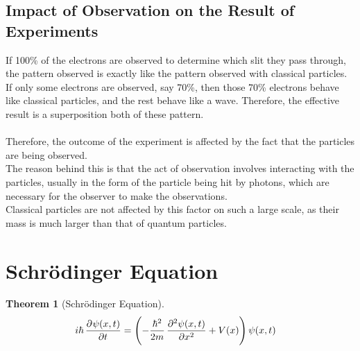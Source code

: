 \documentclass[titlepage, fleqn, a4paper, 12pt, twoside]{article}
\theoremstyle{definition}
\theoremstyle{theorem}
\newtheorem{theorem}{Theorem}
\begin{document}
\subsection{Impact of Observation on the Result of Experiments}

If 100\% of the electrons are observed to determine which slit they pass through, the pattern observed is exactly like the pattern observed with classical particles.\\
If only some electrons are observed, say 70\%, then those 70\% electrons behave like classical particles, and the rest behave like a wave.
Therefore, the effective result is a superposition both of these pattern.\\
~\\
Therefore, the outcome of the experiment is affected by the fact that the particles are being observed.\\
The reason behind this is that the act of observation involves interacting with the particles, usually in the form of the particle being hit by photons, which are necessary for the observer to make the observations.\\
Classical particles are not affected by this factor on such a large scale, as their mass is much larger than that of quantum particles.

\section{Schrödinger Equation}

\begin{theorem}[Schrödinger Equation]
	\begin{align*}
		i \hbar \dpd{\psi(x,t)}{t} & = \left( -\frac{\hbar^2}{2 m} \dpd[2]{\psi(x,t)}{x} + V(x) \right) \psi(x,t)
	\end{align*}
	\label{Schrodinger_Equation}
\end{theorem}
\end{document}
